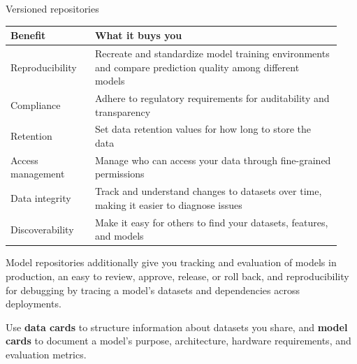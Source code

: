 \begin{frame}{Versioned repositories}
  \begin{withmargin}
    \begin{tdmain}
      \footnotesize
      \begin{tabular}{@{}p{0.24\linewidth}p{0.70\linewidth}@{}}
        \toprule
        \textbf{Benefit} & \textbf{What it buys you}\\
        \midrule
        Reproducibility & Recreate and standardize model training environments
          and compare prediction quality among different models\\[0.3em]
        Compliance & Adhere to regulatory requirements for auditability and
          transparency\\[0.3em]
        Retention & Set data retention values for how long to store the data\\[0.3em]
        Access management & Manage who can access your data through fine-grained
          permissions\\[0.3em]
        Data integrity & Track and understand changes to datasets over time,
          making it easier to diagnose issues\\[0.3em]
        Discoverability & Make it easy for others to find your datasets,
          features, and models\\
        \bottomrule
      \end{tabular}
    \end{tdmain}
    \begin{tdmargin}
      Model repositories additionally give you tracking and evaluation of models
      in production, an easy  to review, approve,
      release, or roll back, and reproducibility for debugging by tracing a
      model's datasets and dependencies across deployments.
      \par\medskip
      Use \textbf{data cards} to structure information about datasets you share,
      and \textbf{model cards} to document a model's purpose, architecture,
      hardware requirements, and evaluation metrics.
    \end{tdmargin}
  \end{withmargin}
\end{frame}

